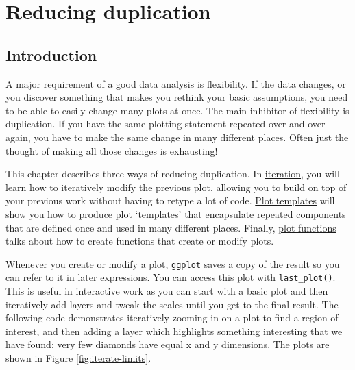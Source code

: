 \chapter{Reducing duplication}\label{cha:duplication}

\section{Introduction}

A major requirement of a good data analysis is flexibility. If the data
changes, or you discover something that makes you rethink your basic
assumptions, you need to be able to easily change many plots at once.
The main inhibitor of flexibility is duplication. If you have the same
plotting statement repeated over and over again, you have to make the
same change in many different places. Often just the thought of making
all those changes is exhausting!

This chapter describes three ways of reducing duplication. In
\hyperref[sec:iteration]{iteration}, you will learn how to iteratively
modify the previous plot, allowing you to build on top of your previous
work without having to retype a lot of code.
\hyperref[sec:templates]{Plot templates} will show you how to produce
plot `templates' that encapsulate repeated components that are defined
once and used in many different places. Finally,
\hyperref[sec:functions]{plot functions} talks about how to create
functions that create or modify plots. 


Whenever you create or modify a plot, \texttt{ggplot} saves a copy of
the result so you can refer to it in later expressions. You can access
this plot with \texttt{last\_plot()}. This is useful in interactive work
as you can start with a basic plot and then iteratively add layers and
tweak the scales until you get to the final result. The following code
demonstrates iteratively zooming in on a plot to find a region of
interest, and then adding a layer which highlights something interesting
that we have found: very few diamonds have equal x and y dimensions. The
plots are shown in Figure \ref{fig:iterate-limits}. 
 

